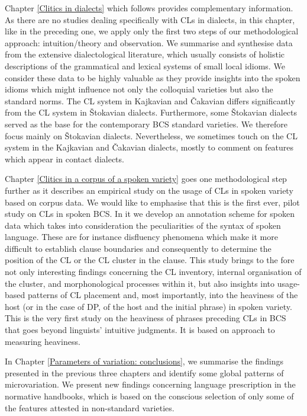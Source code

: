 	Chapter \ref{Clitics in dialects} which follows provides complementary information. As there are no studies dealing specifically with CLs in dialects, in this chapter, like in the preceding one, we apply only the first two steps of our methodological approach: intuition/theory and observation. We summarise and synthesise data from the extensive dialectological literature, which usually consists of holistic descriptions of the grammatical and lexical systems of small local idioms. We consider these data to be highly valuable as they provide insights into the spoken idioms which might influence not only the colloquial varieties but also the standard norms. The CL system in Kajkavian and Čakavian differs significantly from the CL system in Štokavian dialects. Furthermore, some Štokavian dialects served as the base for the contemporary BCS standard varieties. We therefore focus mainly on Štokavian dialects. Nevertheless, we sometimes touch on the CL system in the Kajkavian and Čakavian dialects, mostly to comment on features which appear in contact dialects. 



	Chapter \ref{Clitics in a corpus of a spoken variety} goes one methodological step further as it describes an empirical study on the usage of CLs in spoken variety based on corpus data. We would like to emphasise that this is the first ever, pilot study on CLs in spoken BCS. In it we develop an annotation scheme for spoken data which takes into consideration the peculiarities of the syntax of spoken language. These are for instance disfluency phenomena which make it more difficult to establish clause boundaries and consequently to determine the position of the CL or the CL cluster in the clause. This study brings to the fore not only interesting findings concerning the CL inventory, internal organisation of the cluster, and morphonological processes within it, but also insights into usage-based patterns of CL placement and, most importantly, into the heaviness of the host (or in the case of DP, of the host and the initial phrase) in spoken variety. This is the very first study on the heaviness of phrases preceding CLs in BCS that goes beyond linguists' intuitive judgments. It is based on  approach to measuring heaviness.



	In Chapter \ref{Parameters of variation: conclusions}, we summarise the findings presented in the previous three chapters and identify some global patterns of microvariation. We present new findings concerning language prescription in the normative handbooks, which is based on the conscious selection of only some of the features attested in non-standard varieties. 
